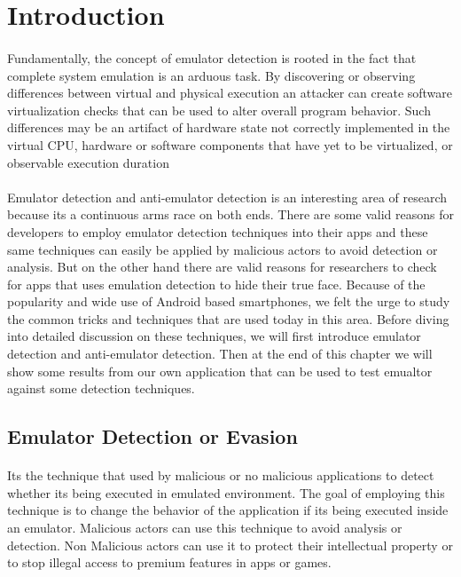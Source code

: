 \documentclass[../main.tex]{subfile}
\begin{document}
	\section{Introduction}\label{sec::intorduction}
	\paragraph{} Fundamentally, the concept of emulator detection is rooted in the fact that complete system emulation is an arduous task. By discovering or observing differences between virtual and physical execution an attacker can create software virtualization checks that can be used to alter overall program behavior. Such differences may be an artifact of hardware state not correctly implemented in the virtual CPU, hardware or software components that have yet to be virtualized, or observable execution duration \cite{vidas2014evading}
	\paragraph{} Emulator detection and anti-emulator detection is an interesting area of research because its a continuous arms race on both ends. There are some valid reasons for developers to employ emulator detection techniques into their apps and these same techniques can easily be applied by malicious actors to avoid detection or analysis. But on the other hand there are valid reasons for researchers to check for apps that uses emulation detection to hide their true face. Because of the popularity and wide use of Android based smartphones, we felt the urge to study the common tricks and techniques that are used today in this area. Before diving into detailed discussion on these techniques, we will first introduce emulator detection and anti-emulator detection. Then at the end of this chapter we will show some results from our own application that can be used to test emualtor against some detection techniques.

	\subsection{Emulator Detection or Evasion}\label{sec::emu_detection}
	\paragraph{} Its the technique that used by malicious or no malicious applications to detect whether its being executed in emulated environment. The goal of employing this technique is to change the behavior of the application if its being executed inside an emulator. Malicious actors can use this technique to avoid analysis or detection. Non Malicious actors can use it to protect their intellectual property or to stop illegal access to premium features in apps or games.
	
\end{document}

